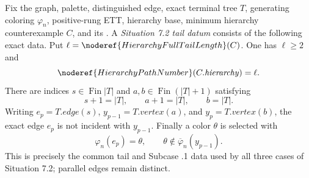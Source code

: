 \begin{definition}
Fix the graph, palette, distinguished edge, exact terminal tree \(T\),
generating coloring \(\varphi_n\), positive-rung ETT, hierarchy base,
minimum hierarchy counterexample \(C\), and its
.  A
\emph{Situation 7.2 tail datum} consists of the following exact data.
Put \(\ell=\noderef{HierarchyFullTailLength}(C)\).  One has
\(\ell\geq2\) and
\[
 \noderef{HierarchyPathNumber}(C.\mathit{hierarchy})=\ell .
\]
There are indices \(s\in\operatorname{Fin}|T|\) and
\(a,b\in\operatorname{Fin}(|T|+1)\) satisfying
\[
 s+1=|T|,\qquad a+1=|T|,\qquad b=|T|.
\]
Writing \(e_p=T.\mathit{edge}(s)\),
\(y_{p-1}=T.\mathit{vertex}(a)\), and
\(y_p=T.\mathit{vertex}(b)\), the exact edge \(e_p\) is not incident
with \(y_{p-1}\).  Finally a color \(\theta\) is selected with
\[
          \varphi_n(e_p)=\theta,\qquad
          \theta\notin\overline\varphi_n(y_{p-1}).
\]
This is precisely the common tail and Subcase .1 data used by all
three cases of Situation 7.2; parallel edges remain distinct.
\end{definition}
